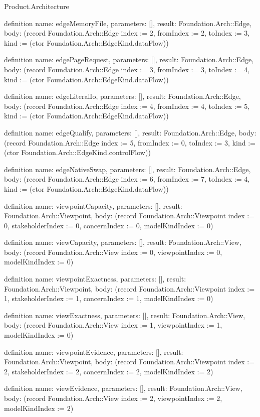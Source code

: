 \begin{lexlean}{Product.Architecture}
\begin{semanticmodule}
definition{
  name: edgeMemoryFile, parameters: [], result: Foundation.Arch::Edge,
  body: (record Foundation.Arch::Edge {index := 2, fromIndex := 2, toIndex := 3, kind := (ctor Foundation.Arch::EdgeKind.dataFlow)})
}

definition{
  name: edgePageRequest, parameters: [], result: Foundation.Arch::Edge,
  body: (record Foundation.Arch::Edge {index := 3, fromIndex := 3, toIndex := 4, kind := (ctor Foundation.Arch::EdgeKind.dataFlow)})
}

definition{
  name: edgeLiteralIo, parameters: [], result: Foundation.Arch::Edge,
  body: (record Foundation.Arch::Edge {index := 4, fromIndex := 4, toIndex := 5, kind := (ctor Foundation.Arch::EdgeKind.dataFlow)})
}

definition{
  name: edgeQualify, parameters: [], result: Foundation.Arch::Edge,
  body: (record Foundation.Arch::Edge {index := 5, fromIndex := 0, toIndex := 3, kind := (ctor Foundation.Arch::EdgeKind.controlFlow)})
}

definition{
  name: edgeNativeSwap, parameters: [], result: Foundation.Arch::Edge,
  body: (record Foundation.Arch::Edge {index := 6, fromIndex := 7, toIndex := 4, kind := (ctor Foundation.Arch::EdgeKind.dataFlow)})
}

definition{
  name: viewpointCapacity, parameters: [], result: Foundation.Arch::Viewpoint,
  body: (record Foundation.Arch::Viewpoint {index := 0, stakeholderIndex := 0, concernIndex := 0, modelKindIndex := 0})
}

definition{
  name: viewCapacity, parameters: [], result: Foundation.Arch::View,
  body: (record Foundation.Arch::View {index := 0, viewpointIndex := 0, modelKindIndex := 0})
}

definition{
  name: viewpointExactness, parameters: [], result: Foundation.Arch::Viewpoint,
  body: (record Foundation.Arch::Viewpoint {index := 1, stakeholderIndex := 1, concernIndex := 1, modelKindIndex := 0})
}

definition{
  name: viewExactness, parameters: [], result: Foundation.Arch::View,
  body: (record Foundation.Arch::View {index := 1, viewpointIndex := 1, modelKindIndex := 0})
}

definition{
  name: viewpointEvidence, parameters: [], result: Foundation.Arch::Viewpoint,
  body: (record Foundation.Arch::Viewpoint {index := 2, stakeholderIndex := 2, concernIndex := 2, modelKindIndex := 2})
}

definition{
  name: viewEvidence, parameters: [], result: Foundation.Arch::View,
  body: (record Foundation.Arch::View {index := 2, viewpointIndex := 2, modelKindIndex := 2})
}


\end{semanticmodule}
\end{lexlean}
